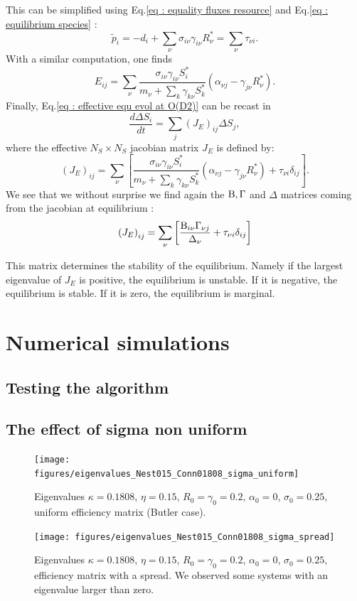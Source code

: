 \documentclass[12pt, titlepage]{report}
\begin{document}
This can be simplified using Eq.\eqref{eq : equality fluxes resource} and Eq.\eqref{eq : equilibrium species} :
\begin{equation}
\tilde{p}_i=-d_i +\sum_\nu \sigma_{i\nu}\gamma_{i\nu}R^*_\nu = \sum_\nu \tau_{\nu i}.
\end{equation}
With a similar computation, one finds
\begin{equation}
E_{ij}=\sum_\nu \frac{\sigma_{i\nu}\gamma_{i\nu}S^*_i}{m_\nu+\sum_k \gamma_{k\nu}S^*_k} \left(\alpha_{\nu j}-\gamma_{j\nu}R^*_\nu\right).
\end{equation}
Finally, Eq.\eqref{eq : effective equ evol at O(D2)} can be recast in
\begin{equation}
\frac{d\Delta S_i}{dt} = \sum_j (J_E)_{ij} \Delta S_j,
\end{equation}
where the effective $N_S\times N_S$ jacobian matrix $J_E$ is defined by:
\begin{equation}
(J_E)_{ij}=\sum_\nu \left[\frac{\sigma_{i\nu}\gamma_{i\nu}S^*_i}{m_\nu+\sum_k \gamma_{k\nu}S^*_k} \left(\alpha_{\nu j}-\gamma_{j\nu}R^*_\nu\right)+\tau_{\nu i}\delta_{ij}\right].
\end{equation}
We see that we without surprise we find again the $\text{B}, \Gamma $ and $\Delta$ matrices coming from the jacobian at equilibrium :
\begin{equation}
\left(J_E\right)_{ij}=\sum_\nu \left[\frac{\text{B}_{i\nu}\Gamma_{\nu j}}{\Delta_\nu}+\tau_{\nu i} \delta_{ij}\right]
\end{equation}

This matrix determines the stability of the equilibrium. Namely if the largest eigenvalue of $J_E$ is positive, the equilibrium is unstable. If it is negative, the equilibrium is stable. If it is zero, the equilibrium is marginal.
\section{Numerical simulations}
\subsection{Testing the algorithm}
\subsection{The effect of sigma non uniform}
\begin{figure}
\texttt{[image: figures/eigenvalues\_Nest015\_Conn01808\_sigma\_uniform]}
\caption{Eigenvalues $\kappa=0.1808$, $\eta=0.15$, $R_0=\gamma_0=0.2$, $\alpha_0=0$, $\sigma_0=0.25$, uniform efficiency matrix (Butler case).}
\texttt{[image: figures/eigenvalues\_Nest015\_Conn01808\_sigma\_spread]}
\caption{Eigenvalues $\kappa=0.1808$, $\eta=0.15$, $R_0=\gamma_0=0.2$, $\alpha_0=0$, $\sigma_0=0.25$, efficiency matrix with a spread. We observed some systems with an eigenvalue larger than zero.}
\end{figure}
\end{document}
